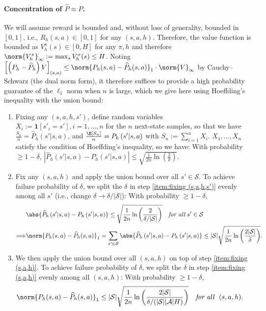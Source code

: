 \paragraph{Concentration of $\widehat{P}\approx P$.}
We will assume reward is bounded and, without loss of generality, bounded in $[0,1]$, i.e., $R_h(s,a)\in[0,1]$ for any $(s,a,h)$.
Therefore, the value function is bounded as $V^\pi_h(s)\in[0,H]$ for any $\pi,h$ and therefore $\norm{V^\pi_h}_\infty:=\max_{s} V^\pi_h(s) \leq H$.
Noting $\left[\left(P_h-\widehat{P}_h\right) V\right]_{(s,a)}\leq\norm{{P}_h(s, a)-\widehat{P}_h(s, a)}_1\cdot \norm{V}_\infty$ by Cauchy–Schwarz (the dual norm form), it therefore suffices to provide a high probability guarantee of the $\ell_1$ norm when $n$ is large, which we give here using Hoeffding's inequality with the union bound:
\begin{enumerate}[label={(\arabic*)}]
    \item \label{item:fixing (s,a,h,s')}
    Fixing any $(s, a, h, s')$, define random variables $X_i:=\mathbf{1}[s'_i=s'], i=1,\ldots,n$ for the $n$ next-state samples, so that we have $\frac{S_n}{n}=\widehat{P}_h(s' | s, a)$, and $\frac{\E[S_n]}{n}=P_h\left(s' | s, a\right)$ with $S_n:=\sum_{i=1}^n X_i$.
    $X_1,\ldots,X_n$ satisfy the condition of Hoeffding's inequality, so we have: With probability $\geq 1-\delta$, $\left|\widehat{P}_h\left(s'| s, a\right)-P_h\left(s'| s, a\right)\right| \leq \sqrt{\frac{1}{2 n} \ln \left(\frac{2}{\delta}\right)}$.
    \item \label{item:fixing (s,a,h)}
    Fix any $(s,a,h)$ and apply the union bound over all $s'\in\mathcal{S}$. To achieve failure probability of $\delta$, we split the $\delta$ in step \ref{item:fixing (s,a,h,s')} evenly among all $s'$ (i.e., change $\delta \to \delta/|\mathcal{S}|$): With probability $\geq 1-\delta$,
    \begin{align*}
    &\abs{\widehat{P}_h\left(s'| s, a\right)-P_h\left(s'| s, a\right)} \leq \sqrt{\frac{1}{2 n} \ln \left(\frac{2}{\delta/|\mathcal{S}|}\right)} \quad \text{{\em for all} $s'\in\mathcal{S}$} \\
    \Longrightarrow& \norm{{P}_h(s, a)-\widehat{P}_h(s, a)}_1 = \sum_{s'\in\mathcal{S}} \abs{\widehat{P}_h\left(s'| s, a\right)-P_h\left(s'| s, a\right)} \leq |\mathcal{S}|  \sqrt{\frac{1}{2 n} \ln \left(\frac{2|\mathcal{S}|}{\delta}\right)}
    .
    \end{align*}
    
    \item \label{item:uniform concentration}
    We then apply the union bound over all $(s,a,h)$ on top of step \ref{item:fixing (s,a,h)}.
    To achieve failure probability of $\delta$,
    we split the $\delta$ in step \ref{item:fixing (s,a,h)} evenly among all $(s,a,h)$: With probability $\geq 1-\delta$,
    \begin{align*}
    &\norm{{P}_h(s, a)-\widehat{P}_h(s, a)}_1 \leq |\mathcal{S}|  \sqrt{\frac{1}{2 n} \ln \left(\frac{2|\mathcal{S}|}{\delta/(|\mathcal{S}||\mathcal{A}|H)}\right)}\quad\text{{\em for all } $(s,a,h)$}.
    \end{align*}
\end{enumerate}

